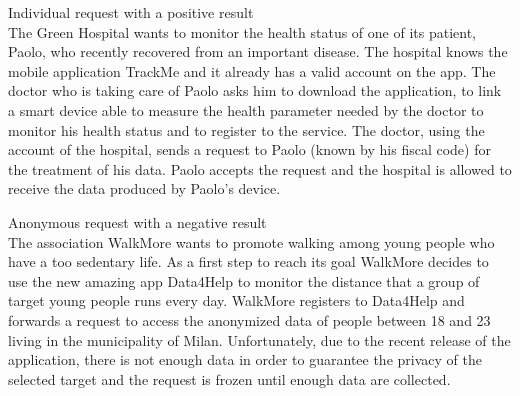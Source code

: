 \documentclass{article}
\begin{document}
\begin{legal}
\begin{legal}
\begin{legal}
{\begin{legal}
		\item Individual request with a positive result\\
 
The Green Hospital wants to monitor the health status of one of its patient, Paolo, who recently recovered from an important disease. The hospital knows the mobile application TrackMe and it already has a valid account on the app. The doctor who is taking care of Paolo asks him to download the application, to link a smart device able to measure the health parameter needed by the doctor to monitor his health status and to register to the service. The doctor, using the account of the hospital, sends a request to Paolo (known by his fiscal code) for the treatment of his data. Paolo accepts the request and the hospital is allowed to receive the data produced by Paolo’s device.\\

		\item Anonymous request with a negative result\\

The association WalkMore wants to promote walking among young people who have a too sedentary life. As a first step to reach its goal WalkMore decides to use the new amazing app Data4Help to monitor the distance that a group of target young people runs every day. WalkMore registers to Data4Help and forwards a request to access the anonymized data of people between 18 and 23 living in the municipality of Milan. Unfortunately, due to the recent release of the application, there is not enough data in order to guarantee the privacy of the selected target and the request is frozen until enough data are collected.  \\


\end{legal}}
\end{legal}
\end{legal}
\end{legal}
\end{document}
